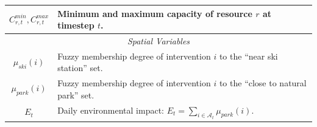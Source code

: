 \begin{table}[!h]
\begin{tabular}{|c|p{11.5cm}|}
    $C_{r,t}^{min}, C_{r,t}^{max}$ & Minimum and maximum capacity of resource $r$ at timestep $t$. \\\hline
    \multicolumn{2}{|c|}{\textit{Spatial Variables}} \\\hline
    $\mu_{ski}(i)$ & Fuzzy membership degree of intervention $i$ to the ``near ski station'' set. \\\hline
    $\mu_{park}(i)$ & Fuzzy membership degree of intervention $i$ to the ``close to natural park'' set. \\\hline
    $E_t$ & Daily environmental impact: $E_t = \sum_{i \in \mathcal{A}_t} \mu_{park}(i)$. \\\hline
  \end{tabular}

\end{table}
 
\newpage

